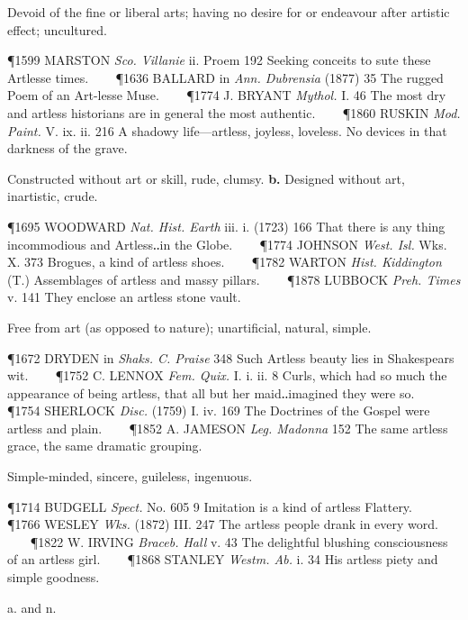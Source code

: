 \begin{description}[wide, labelwidth=!, labelindent=0pt]
\begin{myenumerate}
 Devoid of the fine or liberal arts; having no desire for or endeavour after artistic effect; uncultured.

\P 1599 MARSTON  \textit{Sco. Villanie} ii. Proem 192 Seeking conceits to sute these Artlesse times.    
\P 1636 BALLARD in \textit{Ann. Dubrensia} (1877) 35 The rugged Poem of an Art-lesse Muse.    
\P 1774 J. BRYANT  \textit{Mythol.} I. 46 The most dry and artless historians are in general the most authentic.    
\P 1860 RUSKIN  \textit{Mod. Paint.} V. ix. ii. 216 A shadowy life—artless, joyless, loveless. No devices in that darkness of the grave.

 Constructed without art or skill, rude, clumsy. \textbf{b.} Designed without art, inartistic, crude.

\P 1695 WOODWARD  \textit{Nat. Hist. Earth} iii. i. (1723) 166 That there is any thing incommodious and Artless‥in the Globe.    
\P 1774 JOHNSON  \textit{West. Isl.} Wks. X. 373 Brogues, a kind of artless shoes.    
\P 1782 WARTON  \textit{Hist. Kiddington} (T.) Assemblages of artless and massy pillars.    
\P 1878 LUBBOCK  \textit{Preh. Times} v. 141 They enclose an artless stone vault.

 Free from art (as opposed to nature); unartificial, natural, simple.

\P 1672 DRYDEN in \textit{Shaks. C. Praise} 348 Such Artless beauty lies in Shakespears wit.    
\P 1752 C. LENNOX  \textit{Fem. Quix.} I. i. ii. 8 Curls, which had so much the appearance of being artless, that all but her maid‥imagined they were so.    
\P 1754 SHERLOCK  \textit{Disc.} (1759) I. iv. 169 The Doctrines of the Gospel were artless and plain.    
\P 1852 A. JAMESON  \textit{Leg. Madonna} 152 The same artless grace, the same dramatic grouping.

 Simple-minded, sincere, guileless, ingenuous.

\P 1714 BUDGELL  \textit{Spect.} No. 605 9 Imitation is a kind of artless Flattery.    
\P 1766 WESLEY  \textit{Wks.} (1872) III. 247 The artless people drank in every word.    
\P 1822 W. IRVING  \textit{Braceb. Hall} v. 43 The delightful blushing consciousness of an artless girl.    
\P 1868 STANLEY  \textit{Westm. Ab.} i. 34 His artless piety and simple goodness.
\end{myenumerate}


 a. and n.

\noindent {}


\end{description}
